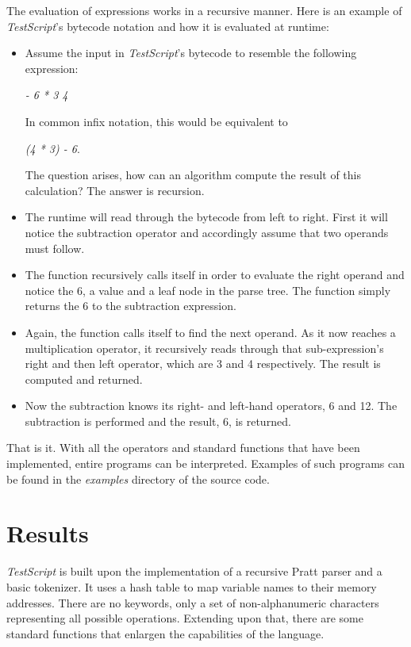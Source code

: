 \documentclass[12pt,a4paper]{article}
\newcommand{\expr}[1] {
    \begin{center}
        #1
    \end{center}
}
\newcommand{\name}{\emph{TestScript}}
\begin{document}
The evaluation of expressions works in a recursive manner. Here is an 
example of \name{}'s bytecode notation and how it is evaluated at runtime:
\begin{itemize}
    \item Assume the input in \name{}'s bytecode to resemble the following expression: 
        \expr{\emph{- 6 * 3 4}}
        In common infix notation, this would be equivalent to 
        \expr{\emph{(4 * 3) - 6}.}
        The question arises, how can an algorithm compute the result of this
        calculation? The answer is recursion.
    \item The runtime will read through the bytecode from left to right. First it will
        notice the subtraction operator and accordingly assume that two
        operands must follow.
    \item The function recursively calls itself in order to evaluate the
        right operand and notice the 6, a value and a leaf node in the parse tree. 
        The function simply returns the 6 to the subtraction expression.
    \item Again, the function calls itself to find the next operand.
        As it now reaches a multiplication operator,
        it recursively reads through that sub-expression's right and then left
        operator, which are 3 and 4 respectively.
        The result is computed and returned.
    \item Now the subtraction knows its right- and left-hand operators, 6 and 12.
        The subtraction is performed and the result, 6, is returned.
\end{itemize}

That is it. With all the operators and standard functions that have been implemented, entire programs
can be interpreted. Examples of such programs can be found in the \emph{examples} directory
of the source code.

\section{Results}

\name{} is built upon the implementation of a recursive Pratt
parser and a basic tokenizer. It uses a hash table to map variable names to their
memory addresses. There are no keywords, only a set of non-alphanumeric characters
representing all possible operations. Extending upon that, there are some
standard functions that enlargen the capabilities of the language.
\end{document}
